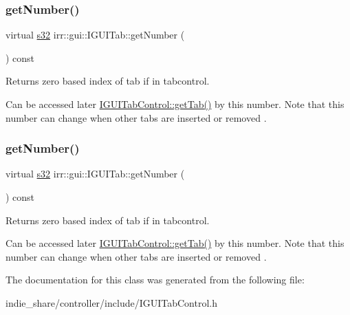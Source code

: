 \subsubsection{\texorpdfstring{get\+Number()}{getNumber()}\hspace{0.1cm}{\footnotesize\ttfamily [1/2]}}
{\footnotesize\ttfamily virtual \hyperlink{namespaceirr_ac66849b7a6ed16e30ebede579f9b47c6}{s32} irr\+::gui\+::\+I\+G\+U\+I\+Tab\+::get\+Number (\begin{DoxyParamCaption}{ }\end{DoxyParamCaption}) const\hspace{0.3cm}{\ttfamily [pure virtual]}}



Returns zero based index of tab if in tabcontrol. 

Can be accessed later \hyperlink{classirr_1_1gui_1_1IGUITabControl_a1ce91106037c880aae15df77f42aeeda}{I\+G\+U\+I\+Tab\+Control\+::get\+Tab()} by this number. Note that this number can change when other tabs are inserted or removed . \mbox{\label{classirr_1_1gui_1_1IGUITab_aedc76f9d93782188741ace78b32634f0}} 
\subsubsection{\texorpdfstring{get\+Number()}{getNumber()}\hspace{0.1cm}{\footnotesize\ttfamily [2/2]}}
{\footnotesize\ttfamily virtual \hyperlink{namespaceirr_ac66849b7a6ed16e30ebede579f9b47c6}{s32} irr\+::gui\+::\+I\+G\+U\+I\+Tab\+::get\+Number (\begin{DoxyParamCaption}{ }\end{DoxyParamCaption}) const\hspace{0.3cm}{\ttfamily [pure virtual]}}



Returns zero based index of tab if in tabcontrol. 

Can be accessed later \hyperlink{classirr_1_1gui_1_1IGUITabControl_a1ce91106037c880aae15df77f42aeeda}{I\+G\+U\+I\+Tab\+Control\+::get\+Tab()} by this number. Note that this number can change when other tabs are inserted or removed . 

The documentation for this class was generated from the following file\+:\begin{DoxyCompactItemize}
\item 
indie\+\_\+share/controller/include/I\+G\+U\+I\+Tab\+Control.\+h\end{DoxyCompactItemize}
